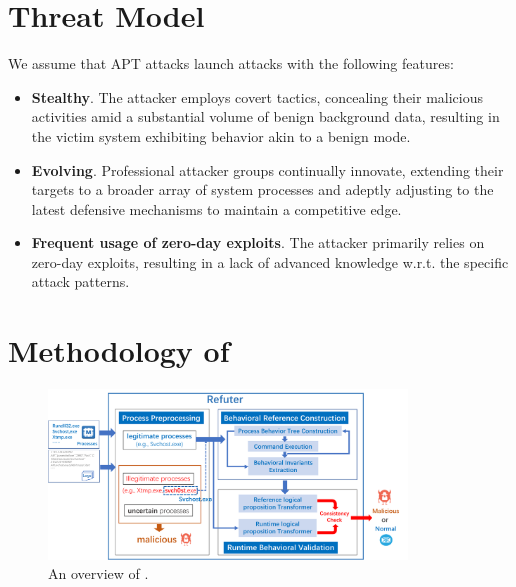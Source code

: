 \section{Threat Model}\label{sec:threatModel}
We assume that APT attacks launch attacks with the following features:

\begin{itemize}[leftmargin=*]
    \item \textbf{Stealthy}. The attacker employs covert tactics, concealing their malicious activities amid a substantial volume of benign background data, resulting in the victim system exhibiting behavior akin to a benign mode.
    \item \textbf{Evolving}. Professional attacker groups continually innovate, extending their targets to a broader array of system processes and adeptly adjusting to the latest defensive mechanisms to maintain a competitive edge.
    \item \textbf{Frequent usage of zero-day exploits}. The attacker primarily relies on zero-day exploits, resulting in a lack of advanced knowledge w.r.t. the specific attack patterns.
\end{itemize}

\section{Methodology of \tool}

\begin{figure}[ht]
    \centering
      \includegraphics[width=0.85\textwidth]{figs/framework_new.pdf}
    \caption{An overview of \tool. }
    \label{fig-framework}
\end{figure}


